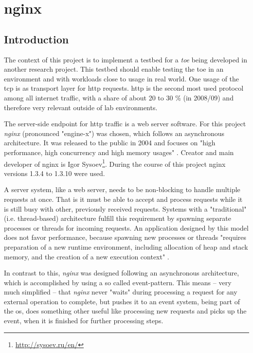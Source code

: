 \chapter{nginx}
\label{ch:nginx}

\section{Introduction}

The context of this project is to implement a testbed for a \textit{\gls{toe}} being developed in another research project. This testbed should enable testing the \gls{toe} in an environment and with workloads close to usage in real world. One usage of the \gls{tcp} is as transport layer for \gls{http} requests. \gls{http} is the second most used protocol among all internet traffic, with a share of about 20 to 30 \% (in 2008/09) \cite{internet_study} and therefore very relevant outside of lab environments. 

The server-side endpoint for \gls{http} traffic is a web server software. For this project \textit{nginx} (pronounced "engine-x") was chosen, which follows an asynchronous architecture. It was released to the public in 2004 and focuses on "high performance, high concurrency and high memory usages" \cite{aosa}. Creator and main developer of nginx is Igor Sysoev\footnote{\url{http://sysoev.ru/en/}}. During the course of this project nginx versions 1.3.4 to 1.3.10 were used.

A server system, like a web server, needs to be non-blocking to handle multiple requests at once. That is it must be able to accept and process requests while it is still busy with other, previously received requests. Systems with a "traditional" (i.e. thread-based) architecture fulfill this requirement by spawning separate processes or threads for incoming requests. An application designed by this model does not favor performance, because spawning new processes or threads "requires preparation of a new runtime environment, including allocation of heap and stack memory, and the creation of a new execution context" \cite{aosa}.

In contrast to this, \textit{nginx} was designed following an asynchronous architecture, which is accomplished by using a so called event-pattern. This means -- very much simplified -- that \textit{nginx} never "waits" during processing a request for any external operation to complete, but pushes it to an event system, being part of the \gls{os}, does something other useful like processing new requests and picks up the event, when it is finished for further processing steps.
\\

